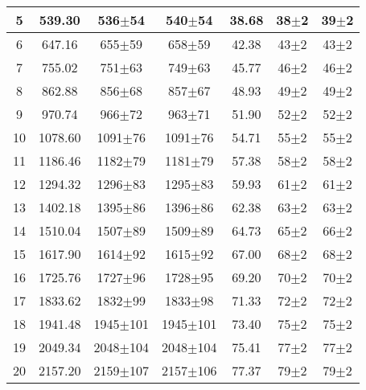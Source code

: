 \begin{table}
\begin{tabular}{|c|c|c|c|c|c|c|}
5&539.30&536$\pm$54&540$\pm$54&38.68&38$\pm$2&39$\pm$2\\ \hline 
6&647.16&655$\pm$59&658$\pm$59&42.38&43$\pm$2&43$\pm$2\\ \hline 
7&755.02&751$\pm$63&749$\pm$63&45.77&46$\pm$2&46$\pm$2\\ \hline 
8&862.88&856$\pm$68&857$\pm$67&48.93&49$\pm$2&49$\pm$2\\ \hline 
9&970.74&966$\pm$72&963$\pm$71&51.90&52$\pm$2&52$\pm$2\\ \hline 
10&1078.60&1091$\pm$76&1091$\pm$76&54.71&55$\pm$2&55$\pm$2\\ \hline 
11&1186.46&1182$\pm$79&1181$\pm$79&57.38&58$\pm$2&58$\pm$2\\ \hline 
12&1294.32&1296$\pm$83&1295$\pm$83&59.93&61$\pm$2&61$\pm$2\\ \hline 
13&1402.18&1395$\pm$86&1396$\pm$86&62.38&63$\pm$2&63$\pm$2\\ \hline 
14&1510.04&1507$\pm$89&1509$\pm$89&64.73&65$\pm$2&66$\pm$2\\ \hline 
15&1617.90&1614$\pm$92&1615$\pm$92&67.00&68$\pm$2&68$\pm$2\\ \hline 
16&1725.76&1727$\pm$96&1728$\pm$95&69.20&70$\pm$2&70$\pm$2\\ \hline 
17&1833.62&1832$\pm$99&1833$\pm$98&71.33&72$\pm$2&72$\pm$2\\ \hline 
18&1941.48&1945$\pm$101&1945$\pm$101&73.40&75$\pm$2&75$\pm$2\\ \hline 
19&2049.34&2048$\pm$104&2048$\pm$104&75.41&77$\pm$2&77$\pm$2\\ \hline 
20&2157.20&2159$\pm$107&2157$\pm$106&77.37&79$\pm$2&79$\pm$2\\ \hline 
\end{tabular} 
\end{table} 
